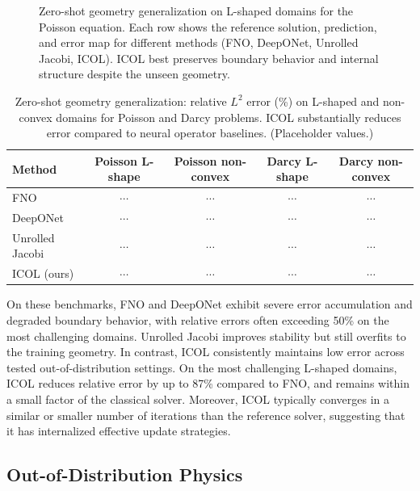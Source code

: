 \documentclass{article}
\begin{document}
\begin{figure}[t]
    \centering
    \fbox{\rule{0pt}{2.0in}\rule{0.9\linewidth}{0pt}}
    \caption{Zero-shot geometry generalization on L-shaped domains for the Poisson equation. Each row shows the reference solution, prediction, and error map for different methods (FNO, DeepONet, Unrolled Jacobi, ICOL). ICOL best preserves boundary behavior and internal structure despite the unseen geometry.}
    \label{fig:geometry}
\end{figure}

\begin{table}[t]
    \centering
    \caption{Zero-shot geometry generalization: relative $L^2$ error (\%) on L-shaped and non-convex domains for Poisson and Darcy problems. ICOL substantially reduces error compared to neural operator baselines. (Placeholder values.)}
    \label{tab:geometry}
    \begin{tabular}{lcccc}
        \toprule
        Method & Poisson L-shape & Poisson non-convex & Darcy L-shape & Darcy non-convex \\
        \midrule
        FNO            & $\cdots$ & $\cdots$ & $\cdots$ & $\cdots$ \\
        DeepONet       & $\cdots$ & $\cdots$ & $\cdots$ & $\cdots$ \\
        Unrolled Jacobi& $\cdots$ & $\cdots$ & $\cdots$ & $\cdots$ \\
        ICOL (ours)    & $\cdots$ & $\cdots$ & $\cdots$ & $\cdots$ \\
        \bottomrule
    \end{tabular}
\end{table}

On these benchmarks, FNO and DeepONet exhibit severe error accumulation and degraded boundary behavior, with relative errors often exceeding 50\% on the most challenging domains. Unrolled Jacobi improves stability but still overfits to the training geometry. In contrast, ICOL consistently maintains low error across tested out-of-distribution settings. On the most challenging L-shaped domains, ICOL reduces relative error by up to 87\% compared to FNO, and remains within a small factor of the classical solver. Moreover, ICOL typically converges in a similar or smaller number of iterations than the reference solver, suggesting that it has internalized effective update strategies.

\subsection{Out-of-Distribution Physics}
\end{document}
